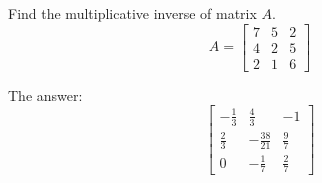 
\begin{question}
Find the multiplicative inverse of matrix \(A\).
\[A = \left[\begin{matrix}7 & 5 & 2\\4 & 2 & 5\\2 & 1 & 6\end{matrix}\right]\]
\end{question}

\begin{solution}
The answer:
\[\left[\begin{matrix}- \frac{1}{3} & \frac{4}{3} & -1\\\frac{2}{3} & - \frac{38}{21} & \frac{9}{7}\\0 & - \frac{1}{7} & \frac{2}{7}\end{matrix}\right]\]
\end{solution}

